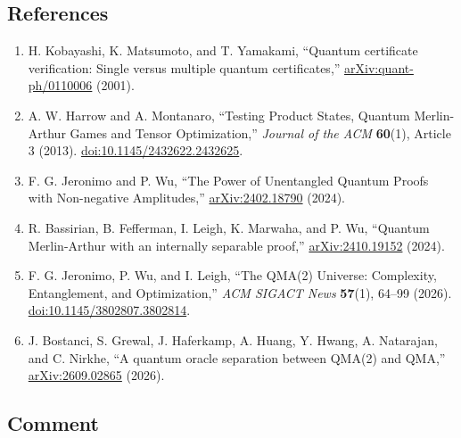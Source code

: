 \subsection*{References}

\begin{enumerate}[label={},leftmargin=4.8em,labelsep=0.5em]
  \footnotesize
  \item[\textup{[KMY01]}]\label{ref:qma2-kmy01}
  H. Kobayashi, K. Matsumoto, and T. Yamakami, ``Quantum certificate
  verification: Single versus multiple quantum certificates,''
  \href{https://arxiv.org/abs/quant-ph/0110006}{arXiv:quant-ph/0110006}
  (2001).

  \item[\textup{[HM13]}]\label{ref:qma2-hm13}
  A. W. Harrow and A. Montanaro, ``Testing Product States, Quantum
  Merlin-Arthur Games and Tensor Optimization,'' \emph{Journal of the ACM}
  \textbf{60}(1), Article 3 (2013).
  \href{https://doi.org/10.1145/2432622.2432625}{doi:10.1145/2432622.2432625}.

  \item[\textup{[JW24]}]\label{ref:qma2-jw24}
  F. G. Jeronimo and P. Wu, ``The Power of Unentangled Quantum Proofs with
  Non-negative Amplitudes,''
  \href{https://arxiv.org/abs/2402.18790}{arXiv:2402.18790} (2024).

  \item[\textup{[BFL+24]}]\label{ref:qma2-bfl24}
  R. Bassirian, B. Fefferman, I. Leigh, K. Marwaha, and P. Wu, ``Quantum
  Merlin-Arthur with an internally separable proof,''
  \href{https://arxiv.org/abs/2410.19152}{arXiv:2410.19152} (2024).

  \item[\textup{[JWL26]}]\label{ref:qma2-jwl26}
  F. G. Jeronimo, P. Wu, and I. Leigh, ``The QMA(2) Universe: Complexity,
  Entanglement, and Optimization,'' \emph{ACM SIGACT News} \textbf{57}(1),
  64--99 (2026).
  \href{https://doi.org/10.1145/3802807.3802814}{doi:10.1145/3802807.3802814}.

  \item[\textup{[BGH+26]}]\label{ref:qma2-bgh26}
  J. Bostanci, S. Grewal, J. Haferkamp, A. Huang, Y. Hwang, A. Natarajan,
  and C. Nirkhe, ``A quantum oracle separation between QMA(2) and QMA,''
  \href{https://arxiv.org/abs/2609.02865}{arXiv:2609.02865} (2026).
\end{enumerate}

\subsection*{Comment}

